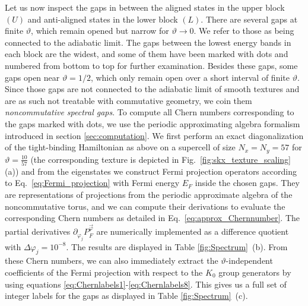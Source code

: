 \documentclass[submission, Phys]{SciPost}
\begin{document}
Let us now inspect the gaps in between the aligned states in the upper block $(U)$ and anti-aligned states in the lower block $(L)$. 
There are several gaps at finite $\vartheta$, which remain opened but narrow for $\vartheta\to0$.
We refer to those as being connected to the adiabatic limit.
The gaps between the lowest energy bands in each block are the widest, and some of them have been marked with dots and numbered from bottom to top for further examination.
Besides these gaps, some gaps open near $\vartheta=1/2$, which only remain open over a short interval of finite $\vartheta$.
Since those gaps are not connected to the adiabatic limit of smooth textures and are as such not treatable with commutative geometry, we coin them {\it noncommutative spectral gaps}.
%
To compute all Chern numbers corresponding to the gaps marked with dots, we use the periodic approximating algebra formalism introduced in section \ref{sec:computation}. 
We first perform an exact diagonalization of the tight-binding Hamiltonian as above on a supercell of size $N_x=N_y=57$ for $\vartheta=\frac{10}{57}$ (the corresponding texture is depicted in Fig.~\ref{fig:skx_texture_scaling} (a)) and from the eigenstates we construct Fermi projection operators according to Eq.~\eqref{eq:Fermi_projection} with Fermi energy $E_F$ inside the chosen gaps. 
They are representations of projections from the periodic approximate algebra of the noncommutative torus, and we can compute their derivations to evaluate the corresponding Chern numbers as detailed in Eq.~\eqref{eq:approx_Chernnumber}.
The partial derivatives $\partial_{\varphi_j}P^{\vec{\varphi}}_F$ are numerically implemented as a difference quotient with $\Delta\varphi_j=10^{-8}$.
The results are displayed in Table \ref{fig:Spectrum}~(b). 
From these Chern numbers, we can also immediately extract the $\vartheta$-independent coefficients of the Fermi projection with respect to the $K_0$ group generators by using equations \eqref{eq:Chernlabels1}-\eqref{eq:Chernlabels8}. This gives us a full set of integer labels for the gaps as displayed in Table \ref{fig:Spectrum}~(c).
\end{document}

